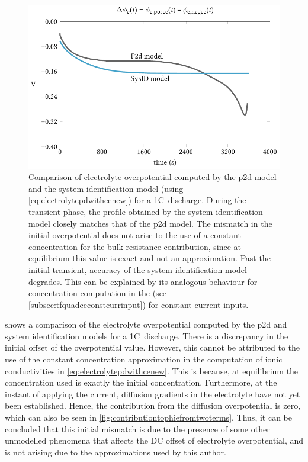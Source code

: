 \begin{figure}[!htbp]
    \centering
    \includegraphics{chapters/sys_id/figures/phie_delta_cnst_1C.pdf}
    \caption[%
    Electrolyte  overpotential  computed  by the    and  system
    identification models for a 1C~discharge
    ]%
    {%
        Comparison    of    electrolyte    overpotential   computed    by    the
        \gls{p2d}     model    and     the    system     identification    model
        (using \cref{eq:electrolytepdwithcenew}) for a  1C~discharge. During the
        transient phase, the profile obtained by the system identification model
        closely matches that of the \gls{p2d} model. The mismatch in the initial
        overpotential does not arise to the  use of a constant concentration for
        the bulk  resistance contribution,  since at  equilibrium this  value is
        exact and  not an  approximation. Past  the initial  transient, accuracy
        of  the system  identification  model degrades.  This  can be  explained
        by  its  analogous  behaviour   for  concentration  computation  in  the
         (see \cref{subsec:tfquadceconstcurrinput}) for constant
        current inputs.
    }%
    \label{fig:phiedeltacnst1C}
\end{figure}

 shows  a comparison of the  electrolyte overpotential
computed  by   the  \gls{p2d}  and   system  identification  models  for   a  1C~discharge. There  is a discrepancy  in the  initial offset of  the overpotential
value.  However,  this  cannot  be  attributed   to  the  use  of  the  constant
concentration  approximation   in  the   computation  of   ionic  conductivities
in \cref{eq:electrolytepdwithcenew}.  This   is  because,  at   equilibrium  the
concentration used  is exactly  the initial  concentration. Furthermore,  at the
instant of applying the current, diffusion gradients in the electrolyte have not
yet been established.  Hence, the contribution from  the diffusion overpotential
is zero,  which can  also be  seen in \cref{fig:contributiontophiefromtwoterms}.
Thus, it can be  concluded that this initial mismatch is due  to the presence of
some  other unmodelled  phenomena  that  affects the  DC  offset of  electrolyte
overpotential, and is not arising due to the approximations used by this author.

